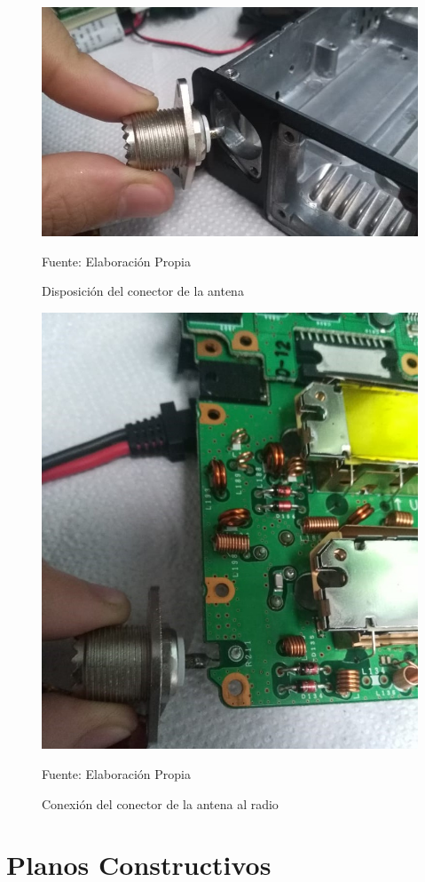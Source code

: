 \begin{figure}[H]
\centering
\includegraphics[scale=0.6]{Figuras/Radio_3.jpeg}
\caption{Disposición del conector de la antena }
Fuente: Elaboración Propia
\label{anexo18}
\end{figure}

\begin{figure}[H]
\centering
\includegraphics[scale=0.6]{Figuras/Radio_4.jpeg}
\caption{Conexión del conector de la antena al radio}
Fuente: Elaboración Propia
\label{anexo19}
\end{figure}

\chapter{Planos Constructivos}

